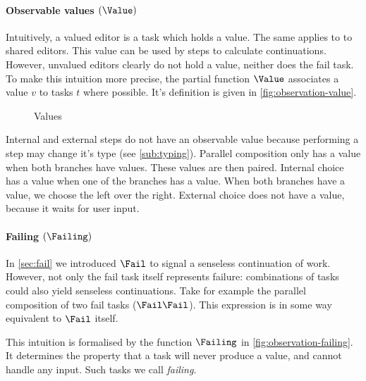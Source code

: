 \paragraph{Observable values $(\Value)$}

Intuitively, a valued editor is a task which holds a value.
The same applies to to shared editors.
This value can be used by steps to calculate continuations.
However, unvalued editors clearly do not hold a value,
neither does the fail task.
To make this intuition more precise,
the partial function $\Value$ associates a value $v$ to tasks $t$ where possible.
It's definition is given in \autoref{fig:observation-value}.

\begin{figure}[h]
  \small
  \caption{Values} \label{fig:observation-value}
\end{figure}

Internal and external steps do not have an observable value because performing a step may change it's type (see \autoref{sub:typing}).
Parallel composition only has a value when both branches have values.
These values are then paired.
Internal choice has a value when one of the branches has a value.
When both branches have a value, we choose the left over the right.
External choice does not have a value, because it waits for user input.



\paragraph{Failing $(\Failing)$}

In \autoref{sec:fail} we introduced $\Fail$ to signal a senseless continuation of work.
However, not only the fail task itself represents failure:
combinations of tasks could also yield senseless continuations.
Take for example the parallel composition of two fail tasks ($\Fail \And \Fail$).
This expression is in some way equivalent to $\Fail$ itself.

This intuition is formalised by the function $\Failing$ in \autoref{fig:observation-failing}.
It determines the property that a task
will never produce a value, and
cannot handle any input.
Such tasks we call \emph{failing}.

